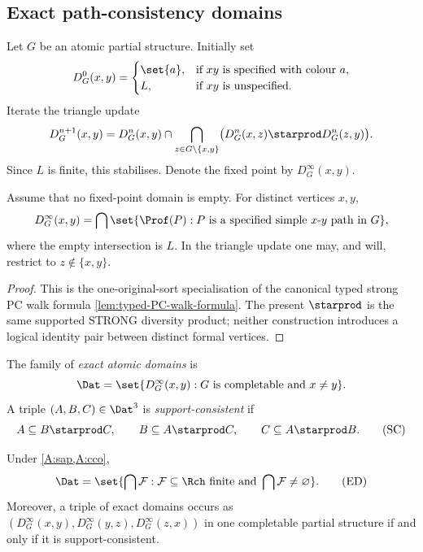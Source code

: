 \subsection{Exact path-consistency domains}

Let \(G\) be an atomic partial structure.  Initially set
\[
  D^0_G(x,y)=
  \begin{cases}
     \set{a},&\text{if }xy\text{ is specified with colour }a,\\
     L,&\text{if }xy\text{ is unspecified.}
  \end{cases}
\]
Iterate the triangle update
\[
  D^{n+1}_G(x,y)=D^n_G(x,y)\cap
  \bigcap_{z\in G\setminus\{x,y\}}\bigl(D^n_G(x,z)\starprod D^n_G(z,y)\bigr).
\]
Since \(L\) is finite, this stabilises.  Denote the fixed point by
\(D_G^\infty(x,y)\).

\begin{lemma}\label{lem:walk-formula}
Assume that no fixed-point domain is empty.  For distinct vertices \(x,y\),
\[
 D_G^\infty(x,y)=
 \bigcap\set{\Prof(P): P\text{ is a specified simple }x\text{-}y\text{ path in }G},
\]
where the empty intersection is \(L\).  In the triangle update one may, and
will, restrict to \(z\notin\{x,y\}\).
\end{lemma}

\begin{proof}
This is the one-original-sort specialisation of
the canonical typed strong PC walk formula
\cref{lem:typed-PC-walk-formula}.
The present $\starprod$ is the same supported
STRONG diversity product; neither construction
introduces a logical identity pair between
distinct formal vertices.
\end{proof}

\begin{definition}
The family of \emph{exact atomic domains} is
\[
 \Dat=\set{D_G^\infty(x,y):G\text{ is completable and }x\neq y}.
\]
A triple \((A,B,C)\in\Dat^3\) is \emph{support-consistent} if
\[
 A\subseteq B\starprod C,\qquad
 B\subseteq A\starprod C,\qquad
 C\subseteq A\starprod B.
 \tag{SC}\label{eq:SC}
\]
\end{definition}

\begin{theorem}\label{thm:exact-domains}
Under \cref{A:sap,A:cco},
\[
 \Dat=\set{\bigcap\mathcal F:\mathcal F\subseteq\Rch\text{ finite and }
                    \bigcap\mathcal F\neq\varnothing}.
 \tag{ED}\label{eq:ED}
\]
Moreover, a triple of exact domains occurs as
\((D_G^\infty(x,y),D_G^\infty(y,z),D_G^\infty(z,x))\) in one completable
partial structure if and only if it is support-consistent.
\end{theorem}

